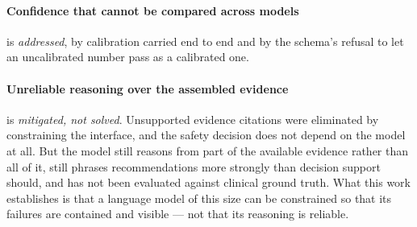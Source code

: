 \paragraph{Confidence that cannot be compared across models} is \emph{addressed}, by
calibration carried end to end and by the schema's refusal to let an uncalibrated number pass
as a calibrated one.

\paragraph{Unreliable reasoning over the assembled evidence} is \emph{mitigated, not solved}.
Unsupported evidence citations were eliminated by constraining the interface, and the safety
decision does not depend on the model at all. But the model still reasons from part of the
available evidence rather than all of it, still phrases recommendations more strongly than
decision support should, and has not been evaluated against clinical ground truth. What this
work establishes is that a language model of this size can be constrained so that its failures
are contained and visible --- not that its reasoning is reliable.
